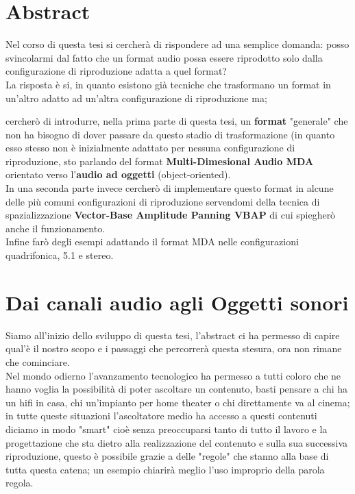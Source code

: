 \documentclass[12pt,a4paper]{report}
\begin{document}
\tableofcontents

\listoffigures



\chapter*{Abstract}

Nel corso di questa tesi si cercherà di rispondere ad una semplice domanda: posso svincolarmi dal fatto che un format audio possa essere riprodotto solo dalla configurazione di riproduzione adatta a quel format?\\

La risposta è si, in quanto esistono già tecniche che trasformano un format in un'altro adatto ad un'altra configurazione di riproduzione ma; 

 cercherò di introdurre, nella prima parte di questa tesi, un \textbf{format} "generale" che non ha bisogno di dover passare da questo stadio di trasformazione (in quanto esso stesso non è inizialmente adattato per nessuna configurazione di riproduzione, sto parlando del format \textbf{Multi-Dimesional Audio MDA} orientato verso l'\textbf{audio ad oggetti} (object-oriented).\\

In una seconda parte invece cercherò di implementare questo format in alcune delle più comuni configurazioni di riproduzione servendomi della tecnica di spazializzazione \textbf{Vector-Base Amplitude Panning VBAP} di cui spiegherò anche il funzionamento.\\

Infine farò degli esempi adattando il format MDA nelle configurazioni quadrifonica, 5.1 e stereo.


\chapter{Dai canali audio agli Oggetti sonori}

Siamo all'inizio dello sviluppo di questa tesi, l'abstract ci ha permesso di capire qual'è il nostro scopo e i passaggi che percorrerà questa stesura, ora non rimane che cominciare.\\

Nel mondo odierno l'avanzamento tecnologico ha permesso a tutti coloro che ne hanno voglia la possibilità di poter ascoltare un contenuto, basti pensare a chi ha un hifi in casa, chi un'impianto per home theater o chi direttamente va al cinema; in tutte queste situazioni l'ascoltatore medio ha accesso a questi contenuti diciamo in modo "smart" cioè senza preoccuparsi tanto di tutto il lavoro e la progettazione che sta dietro alla realizzazione del contenuto e sulla sua successiva riproduzione, questo è possibile grazie a delle "regole" che stanno alla base di tutta questa catena; un esempio chiarirà meglio l'uso improprio della parola regola.\\
\end{document}
